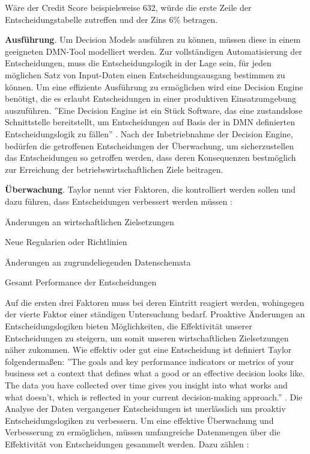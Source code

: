 Wäre der Credit Score beispielsweise 632, würde die erste Zeile der Entscheidungstabelle zutreffen und der Zins 6\%  betragen.

\textbf{Ausführung}. Um Decision Models ausführen zu können, müssen diese in einem geeigneten DMN-Tool modelliert werden. Zur vollständigen Automatisierung der Entscheidungen, muss die Entscheidungslogik in der Lage sein, für jeden möglichen Satz von Input-Daten einen
Entscheidungsausgang bestimmen zu können. Um eine effiziente Ausführung zu ermöglichen wird eine Decision Engine benötigt, die es erlaubt Entscheidungen in einer produktiven Einsatzumgebung auszuführen. ''Eine Decision Engine ist ein Stück Software, das eine zustandslose Schnittstelle bereitstellt, um Entscheidungen auf Basis der in DMN definierten Entscheidungslogik zu fällen'' \cite[S. 41]{BR16}. Nach der Inbetriebnahme der Decision Engine, bedürfen die getroffenen Entscheidungen der Überwachung, um sicherzustellen das Entscheidungen so getroffen werden, dass deren Konsequenzen bestmöglich zur Erreichung der betriebswirtschaftlichen Ziele beitragen.

\textbf{Überwachung}. Taylor nennt vier Faktoren, die kontrolliert werden sollen und dazu führen, dass Entscheidungen verbessert werden müssen \cite[vgl. S. 158]{JT11}:

\begin{enumerate*}
\item Änderungen an wirtschaftlichen Zielsetzungen
\item Neue Regularien oder Richtlinien
\item Änderungen an zugrundeliegenden Datenschemata  
\item Gesamt Performance der Entscheidungen\end{enumerate*}   

Auf die ersten drei Faktoren muss bei deren Eintritt reagiert werden, wohingegen der vierte Faktor einer ständigen Untersuchung bedarf. Proaktive Änderungen an Entscheidungslogiken bieten Möglichkeiten, die Effektivität unserer Entscheidungen zu steigern, um somit unseren wirtschaftlichen Zielsetzungen näher zukommen. Wie effektiv oder gut eine Entscheidung ist definiert Taylor folgendermaßen: ''The goals and key performance indicators or metrics of your business set a context that defines what a good or an effective decision looks like. The data you have collected over time gives you insight into what works and what doesn't, which is reflected in your current decision-making approach.'' \cite[vgl. S. 159]{JT11}. Die Analyse der Daten vergangener Entscheidungen ist unerlässlich um proaktiv Entscheidungslogiken zu verbessern. Um eine effektive Überwachung und Verbesserung zu ermöglichen, müssen umfangreiche Datenmengen über die Effektivität von Entscheidungen gesammelt werden. Dazu zählen \cite[vgl. S. 164]{JT11}:

